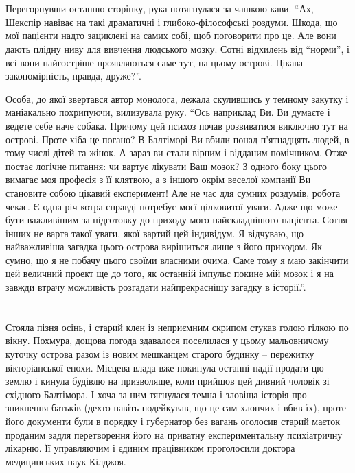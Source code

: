 \documentclass[a4paper,oneside]{book}
\begin{document}
\section*{} 
 
Перегорнувши останню сторінку, рука потягнулася за чашкою кави. “Ах, Шекспір
навіває на такі драматичні і глибоко-філософські роздуми. Шкода, що мої
пацієнти надто зациклені на самих собі, щоб поговорити про це. Але вони дають
плідну ниву для вивчення людського мозку. Сотні відхилень від “норми”, і всі
вони найгостріше проявляються саме тут, на цьому острові. Цікава
закономірність, правда, друже?”.

Особа, до якої звертався автор монолога, лежала скулившись у темному закутку і
маніакально похрипуючи, вилизувала руку. “Ось наприклад Ви. Ви думаєте і
ведете себе наче собака. Причому цей психоз почав розвиватися виключно тут на
острові. Проте хіба це погано? В Балтіморі Ви вбили понад п’ят\-над\-цять
людей, в тому числі дітей та жінок. А зараз ви стали вірним і відданим
помічником. Отже постає логічне питання: чи вартує лікувати Ваш мозок? З
одного боку цього вимагає моя професія з її клятвою, а з іншого окрім веселої
компанії Ви становите собою цікавий експеримент! Але не час для сумних
роздумів, робота чекає. Є одна річ котра справді потребує моєї цілковитої
уваги. Адже що може бути важливішим за підготовку до приходу мого
найскладнішого пацієнта. Сотня інших не варта такої уваги, якої вартий цей
індивідум. Я відчуваю, що найважливіша загадка цього острова вирішиться лише з
його приходом. Як сумно, що я не побачу цього своїми власними очима. Саме тому
я маю закінчити цей величний проект ще до того, як останній імпульс покине мій
мозок і я на завжди втрачу можливість розгадати найпрекраснішу загадку в
історії.”.

\section*{}
 
Стояла пізня осінь, і старий клен із неприємним скрипом стукав голою гілкою по
вікну. Похмура, дощова погода здавалося поселилася у цьому мальовничому
куточку острова разом із новим мешканцем старого будинку – пережитку
вікторіанської епохи. Місцева влада вже покинула останні надії продати цю
землю і кинула будівлю на призволяще, коли прийшов цей дивний чоловік зі
східного Балтімора. І хоча за ним тягнулася темна  і зловіща історія про
зникнення батьків (дехто навіть подейкував, що це сам хлопчик і вбив їх),
проте його документи були в порядку і губернатор без вагань оголосив старий
маєток проданим задля перетворення його на приватну експериментальну
психіатричну лікарню. Її управляючим і єдиним працівником проголосили доктора
медицинських наук Кілджоя.
\end{document}

